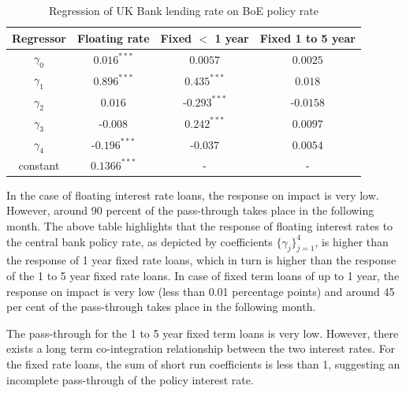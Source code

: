\documentclass[12pt]{article}
\numberwithin{equation}{section}
\begin{document}
\begin {table}[H]
\caption {Regression of UK Bank lending rate on BoE policy rate} \label{tab:title} 
\begin{center}
	\begin{tabular}{||c c c c  ||} 
		\hline
		Regressor & Floating rate & Fixed $<$ 1 year& Fixed 1 to 5 year \\ [0.5ex] 
		\hline\hline
		$\gamma_{0}$ & $0.016^{***}$ & $0.0057$& $0.0025$ \\ 
		\hline
		$\gamma_{1}$& $0.896^{***}$ & $0.435^{***}$& $0.018$  \\ 
		\hline
		 $\gamma_{2}$&$0.016$ & -$0.293^{***}$& -$0.0158$\\
		
		\hline
	$\gamma_{3}$	&  -$0.008$ & $0.242^{***}$& $0.0097$ \\
		\hline
		$\gamma_{4}$&-$0.196^{***}$ &-$0.037$& $0.0054$ \\  
		\hline
		constant&$0.1366^{***}$ & - & -\\ 
			
			\hline
		
		\hline
		
	\end{tabular}

\end{center}

\end {table}



In the case of floating interest rate loans, the response on impact is very low. However, around 90 percent of the pass-through takes place in the following month. The above table highlights that the response of floating interest rates to the central bank policy rate, as depicted by coefficients $\{ \gamma_{j} \}_{j=1}^{4} $,  is higher than the response of 1 year fixed rate loans, which in turn is higher than the response of the 1 to 5 year fixed rate loans.  In case of fixed term loans of up to 1 year, the response on impact is very low (less than 0.01 percentage points) and around 45 per cent of the pass-through takes place in the following month. 


The pass-through for the 1 to 5 year fixed term loans is very low. However, there exists a long term co-integration relationship between the two interest rates. For the fixed rate loans, the sum of short run coefficients is less than 1, suggesting an incomplete pass-through of the policy interest rate.
\end{document}
